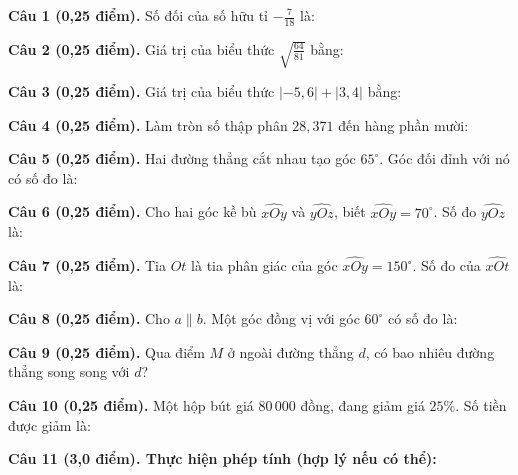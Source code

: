 \documentclass[12pt,a4paper]{article}
\begin{document}
\noindent\textbf{Câu 1 (0,25 điểm).} Số đối của số hữu tỉ $-\frac{7}{18}$ là: \par\vspace{2.4mm}
\noindent\textbf{Câu 2 (0,25 điểm).} Giá trị của biểu thức $\sqrt{\frac{64}{81}}$ bằng: \par\vspace{2.4mm}
\noindent\textbf{Câu 3 (0,25 điểm).} Giá trị của biểu thức $|-5{,}6| + |3{,}4|$ bằng: \par\vspace{2.4mm}
\noindent\textbf{Câu 4 (0,25 điểm).} Làm tròn số thập phân $28{,}371$ đến hàng phần mười: \par\vspace{2.4mm}
\noindent\textbf{Câu 5 (0,25 điểm).} Hai đường thẳng cắt nhau tạo góc $65^\circ$. Góc đối đỉnh với nó có số đo là: \par\vspace{2.4mm}
\noindent\textbf{Câu 6 (0,25 điểm).} Cho hai góc kề bù $\widehat{xOy}$ và $\widehat{yOz}$, biết $\widehat{xOy} = 70^\circ$. Số đo $\widehat{yOz}$ là: \par\vspace{2.4mm}
\noindent\textbf{Câu 7 (0,25 điểm).} Tia $Ot$ là tia phân giác của góc $\widehat{xOy} = 150^\circ$. Số đo của $\widehat{xOt}$ là: \par\vspace{2.4mm}
\noindent\textbf{Câu 8 (0,25 điểm).} Cho $a \parallel b$. Một góc đồng vị với góc $60^\circ$ có số đo là: \par\vspace{2.4mm}
\noindent\textbf{Câu 9 (0,25 điểm).} Qua điểm $M$ ở ngoài đường thẳng $d$, có bao nhiêu đường thẳng song song với $d$? \par\vspace{2.4mm}
\noindent\textbf{Câu 10 (0,25 điểm).} Một hộp bút giá $80\,000$ đồng, đang giảm giá $25\%$. Số tiền được giảm là: \par\vspace{2.4mm}
\vspace{0.4mm}

\noindent\textbf{Câu 11 (3,0 điểm). Thực hiện phép tính (hợp lý nếu có thể):}
\vspace{0.8mm}
\end{document}
